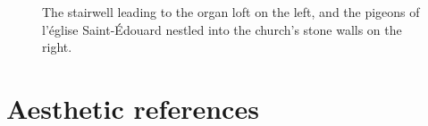 \documentclass[12pt,twoside,maitrise]{dms_ks}
\theoremstyle{definition}
\begin{document}
{\begin{figure}[h]
    \centering
    \caption{The stairwell leading to the organ loft on the left, and the pigeons of l'église Saint-Édouard nestled into the church's stone walls on the right.}
    \label{fig:sidebyside}
\end{figure}

\section{Aesthetic references}

}
\end{document}
